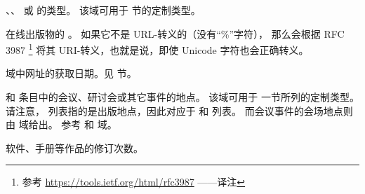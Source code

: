 \begin{fieldlist}
、、 或  的类型。
该域可用于  节的定制类型。




在线出版物的 。
如果它不是 URL-转义的（没有“\%”字符），
那么会根据 RFC 3987 \footnote{
	参考 \url{https://tools.ietf.org/html/rfc3987} ——译注}
将其 URI-转义，也就是说，即使 Unicode 字符也会正确转义。




 域中网址的获取日期。见  节。




 和  条目中的会议、研讨会或其它事件的地点。
该域可用于  一节所列的定制类型。
请注意， 列表指的是出版地点，因此对应于  和  列表。
而会议事件的会场地点则由  域给出。
参考  和  域。




软件、手册等作品的修订次数。



\end{fieldlist}
